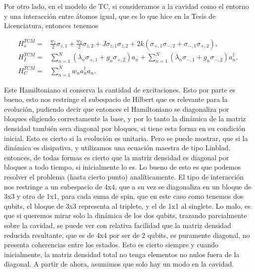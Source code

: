 Por otro lado, en el modelo de TC, si consideramos a la cavidad como el entorno y una interacción entre átomos igual, que es lo que hice en la Tesis de Licenciatura, entonces tenemos

\begin{align}
    H^{TCM}_s=&\frac{w_1}{2}\sigma_{z,1}+\frac{w_2}{2}\sigma_{z,2}+J\sigma_{z,1}\sigma_{z,2}+2k(\sigma_{+,1}\sigma_{-,2}+\sigma_{-,1}\sigma_{+,2}), \\
    H^{TCM}_I=&\sum_{n=1}^N(\lambda_n\sigma_{+,1}+g_n\sigma_{+,2})a_n+\sum_{n=1}^N(\lambda_n\sigma_{-,1}+g_n\sigma_{-,2})a^\dagger_n, \\
    H^{TCM}_C=&\sum_{n=1}^Nw_na^\dagger_na_n.
\end{align}

Este Hamiltoniano si conserva la cantidad de excitaciones. Esto por parte es bueno, esto nos restringe el subespacio de Hilbert que es relevante para la evolución, pudiendo decir que entonces el Hamiltoniano se diagonaliza por bloques eligiendo correctamente la base, y por lo tanto la dinámica de la matriz densidad también sera diagonal por bloques, si tiene esta forma en su condición inicial. Esto es cierto si la evolución es unitaria. Pero se puede mostrar, que si la dinámica es disipativa, y utilizamos una ecuación maestra de tipo Linblad, entonces, de todas formas es cierto que la matriz densidad es diagonal por bloques a todo tiempo, si inicialmente lo es. Lo bueno de esto es que podemos resolver el problema (hasta cierto punto) analíticamente. El tipo de interacción nos restringe a un subespacio de 4x4, que a su vez se diagonaliza en un bloque de 3x3 y otro de 1x1, para cada suma de spin, que en este caso como tenemos dos qubits, el bloque de 3x3 representa al triplete, y el de 1x1 al singlete. Lo malo, es que si queremos mirar solo la dinámica de los dos qubits, trazando parcialmente sobre la cavidad, se puede ver con relativa facilidad que la matriz densidad reducida resultante, que es de 4x4 por ser de 2 qubits, es puramente diagonal, no presenta coherencias entre los estados. Esto es cierto siempre y cuando inicialmente, la matriz densidad total no tenga elementos no nulos fuera de la diagonal. A partir de ahora, asumimos que solo hay un modo en la cavidad.


